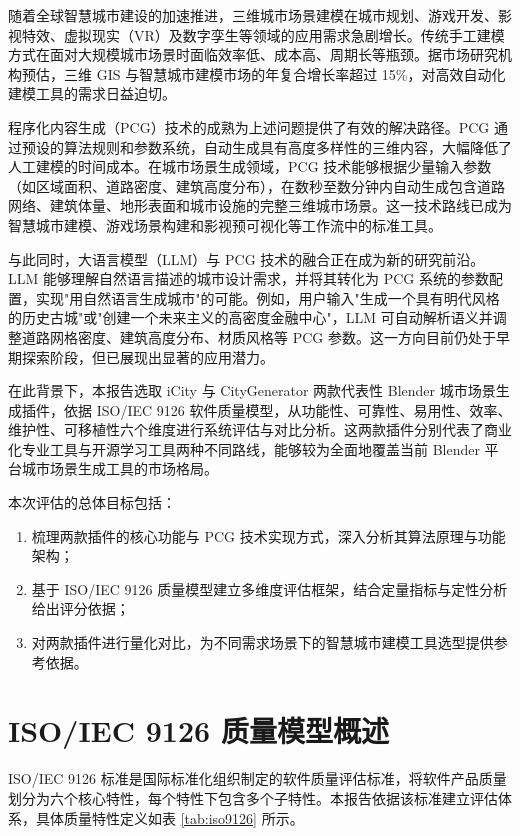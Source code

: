 \documentclass[UTF8,a4paper,10pt]{ctexart}
\begin{document}
随着全球智慧城市建设的加速推进，三维城市场景建模在城市规划、游戏开发、影视特效、虚拟现实（VR）及数字孪生等领域的应用需求急剧增长。传统手工建模方式在面对大规模城市场景时面临效率低、成本高、周期长等瓶颈。据市场研究机构预估，三维 GIS 与智慧城市建模市场的年复合增长率超过 15\%，对高效自动化建模工具的需求日益迫切。

程序化内容生成（PCG）技术的成熟为上述问题提供了有效的解决路径。PCG 通过预设的算法规则和参数系统，自动生成具有高度多样性的三维内容，大幅降低了人工建模的时间成本。在城市场景生成领域，PCG 技术能够根据少量输入参数（如区域面积、道路密度、建筑高度分布），在数秒至数分钟内自动生成包含道路网络、建筑体量、地形表面和城市设施的完整三维城市场景。这一技术路线已成为智慧城市建模、游戏场景构建和影视预可视化等工作流中的标准工具。

与此同时，大语言模型（LLM）与 PCG 技术的融合正在成为新的研究前沿。LLM 能够理解自然语言描述的城市设计需求，并将其转化为 PCG 系统的参数配置，实现"用自然语言生成城市"的可能。例如，用户输入"生成一个具有明代风格的历史古城"或"创建一个未来主义的高密度金融中心"，LLM 可自动解析语义并调整道路网格密度、建筑高度分布、材质风格等 PCG 参数。这一方向目前仍处于早期探索阶段，但已展现出显著的应用潜力。

在此背景下，本报告选取 iCity 与 CityGenerator 两款代表性 Blender 城市场景生成插件，依据 ISO/IEC 9126 软件质量模型，从功能性、可靠性、易用性、效率、维护性、可移植性六个维度进行系统评估与对比分析。这两款插件分别代表了商业化专业工具与开源学习工具两种不同路线，能够较为全面地覆盖当前 Blender 平台城市场景生成工具的市场格局。

本次评估的总体目标包括：
\begin{enumerate}
    \item 梳理两款插件的核心功能与 PCG 技术实现方式，深入分析其算法原理与功能架构；
    \item 基于 ISO/IEC 9126 质量模型建立多维度评估框架，结合定量指标与定性分析给出评分依据；
    \item 对两款插件进行量化对比，为不同需求场景下的智慧城市建模工具选型提供参考依据。
\end{enumerate}

\section{ISO/IEC 9126 质量模型概述}
ISO/IEC 9126 标准是国际标准化组织制定的软件质量评估标准，将软件产品质量划分为六个核心特性，每个特性下包含多个子特性。本报告依据该标准建立评估体系，具体质量特性定义如表 \ref{tab:iso9126} 所示。
\end{document}
